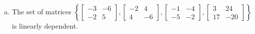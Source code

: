 \begin{exerciseAnswer}
\begin{enumerate}[(a)]
\item The set of matrices \( \left\{ \left[\begin{array}{cc}
-3 & -6 \\
-2 & 5
\end{array}\right] , \left[\begin{array}{cc}
-2 & 4 \\
4 & -6
\end{array}\right] , \left[\begin{array}{cc}
-1 & -4 \\
-5 & -2
\end{array}\right] , \left[\begin{array}{cc}
3 & 24 \\
17 & -20
\end{array}\right] \right\} \)is linearly dependent.
\end{enumerate}
    
\end{exerciseAnswer}
    
